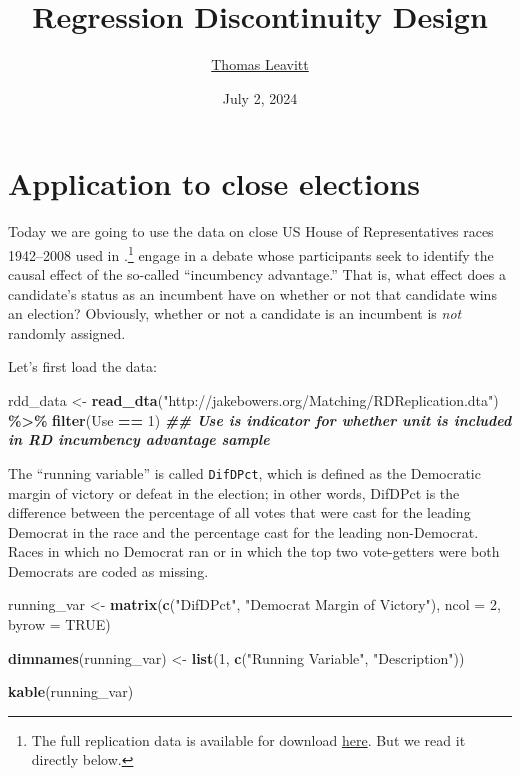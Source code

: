 \documentclass[
  12pt,
  leqno]{article}
\title{Regression Discontinuity Design}
\author{\href{mailto:thomas.leavitt@baruch.cuny.edu}{Thomas Leavitt}}
\date{July 2, 2024}
\newenvironment{Shaded}{\begin{snugshade}}{\end{snugshade}}
\newcommand{\AttributeTok}[1]{\textcolor[rgb]{0.13,0.29,0.53}{#1}}
\newcommand{\ConstantTok}[1]{\textcolor[rgb]{0.56,0.35,0.01}{#1}}
\newcommand{\DecValTok}[1]{\textcolor[rgb]{0.00,0.00,0.81}{#1}}
\newcommand{\DocumentationTok}[1]{\textcolor[rgb]{0.56,0.35,0.01}{\textbf{\textit{#1}}}}
\newcommand{\FunctionTok}[1]{\textcolor[rgb]{0.13,0.29,0.53}{\textbf{#1}}}
\newcommand{\NormalTok}[1]{#1}
\newcommand{\OtherTok}[1]{\textcolor[rgb]{0.56,0.35,0.01}{#1}}
\newcommand{\SpecialCharTok}[1]{\textcolor[rgb]{0.81,0.36,0.00}{\textbf{#1}}}
\newcommand{\StringTok}[1]{\textcolor[rgb]{0.31,0.60,0.02}{#1}}
\begin{document}
\maketitle

\section{Application to close elections}

Today we are going to use the data on close US House of Representatives
races 1942--2008 used in \citet{caugheysekhon2011}.\footnote{The full
  replication data is available for download
  \href{http://sekhon.berkeley.edu/rep/RDReplication.zip}{here}. But we
  read it directly below.} \citet{caugheysekhon2011} engage in a debate
whose participants seek to identify the causal effect of the so-called
``incumbency advantage.'' That is, what effect does a candidate's status
as an incumbent have on whether or not that candidate wins an election?
Obviously, whether or not a candidate is an incumbent is \emph{not}
randomly assigned.

Let's first load the data: \scriptsize

\begin{Shaded}
\begin{Highlighting}[]
\NormalTok{rdd\_data }\OtherTok{\textless{}{-}} \FunctionTok{read\_dta}\NormalTok{(}\StringTok{"http://jakebowers.org/Matching/RDReplication.dta"}\NormalTok{) }\SpecialCharTok{\%\textgreater{}\%}
    \FunctionTok{filter}\NormalTok{(Use }\SpecialCharTok{==} \DecValTok{1}\NormalTok{)  }\DocumentationTok{\#\# Use is indicator for whether unit is included in RD incumbency advantage sample}
\end{Highlighting}
\end{Shaded}

\normalsize

The ``running variable'' is called \texttt{DifDPct}, which is defined as
the Democratic margin of victory or defeat in the election; in other
words, DifDPct is the difference between the percentage of all votes
that were cast for the leading Democrat in the race and the percentage
cast for the leading non-Democrat. Races in which no Democrat ran or in
which the top two vote-getters were both Democrats are coded as missing.

\scriptsize

\begin{Shaded}
\begin{Highlighting}[]
\NormalTok{running\_var }\OtherTok{\textless{}{-}} \FunctionTok{matrix}\NormalTok{(}\FunctionTok{c}\NormalTok{(}\StringTok{"DifDPct"}\NormalTok{, }\StringTok{"Democrat Margin of Victory"}\NormalTok{), }\AttributeTok{ncol =} \DecValTok{2}\NormalTok{, }\AttributeTok{byrow =} \ConstantTok{TRUE}\NormalTok{)}

\FunctionTok{dimnames}\NormalTok{(running\_var) }\OtherTok{\textless{}{-}} \FunctionTok{list}\NormalTok{(}\DecValTok{1}\NormalTok{, }\FunctionTok{c}\NormalTok{(}\StringTok{"Running Variable"}\NormalTok{, }\StringTok{"Description"}\NormalTok{))}

\FunctionTok{kable}\NormalTok{(running\_var)}
\end{Highlighting}
\end{Shaded}
\end{document}
